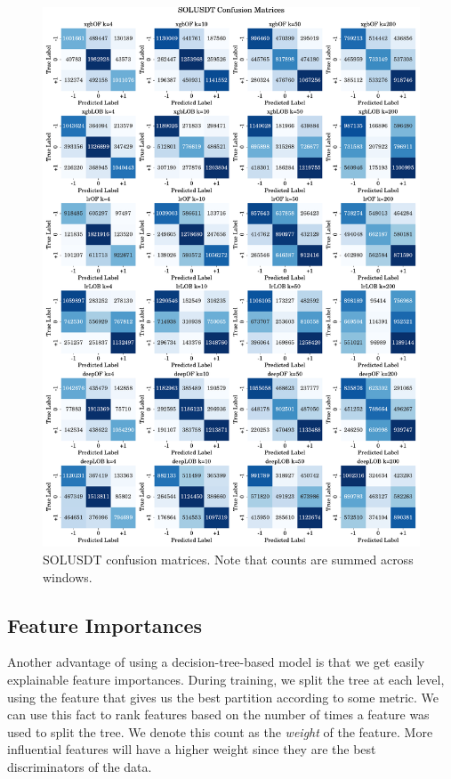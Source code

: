 \begin{figure}[htpb!]
    \centering
    \includegraphics[width=1.0\textwidth]{./images/SOLUSDT_confusion_matrices.pdf}
    \caption{SOLUSDT confusion matrices. Note that counts are summed across windows.}
    \label{SOLUSDT_cm}
\end{figure}


\subsection{Feature Importances}
Another advantage of using a decision-tree-based model is that we get easily explainable
feature importances. During training, we split the tree at each level, using the feature
that gives us the best partition according to some metric. We can use this fact
to rank features based on the number of times a feature was used to split the tree. We
denote this count as the \textit{weight} of the feature.
More influential features will have a higher weight since they are the best discriminators
of the data.

